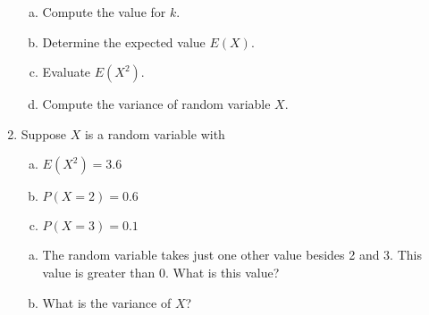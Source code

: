 \documentclass[a4paper,12pt]{article}
\begin{document}
\begin{enumerate}
\begin{enumerate}[(a)]
	\item Compute the value for $k$.
			\item Determine the expected value $E(X)$.
			\item Evaluate $E(X^2)$.
			\item Compute the variance of random variable $X$.
		\end{enumerate}
		\item 
		Suppose $X$ is a random variable with 
\begin{enumerate}[(a)]
			\item $E(X^2)=3.6$
			\item $P(X=2)=0.6$
			\item $P(X=3)=0.1$
		\end{enumerate}
		
		\begin{enumerate}[(a)]
			\item The random variable takes just one other value besides 2 and 3. This value is greater than 0. What is this value?
			\item What is the variance of $X$?
	
	\end{enumerate}
\end{enumerate}
\end{document}
